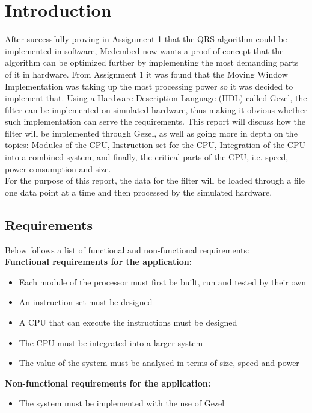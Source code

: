 \documentclass[12pt,a4paper]{article}
\begin{document}
\section{Introduction}
	After successfully proving in Assignment 1 that the QRS algorithm could be implemented in software, Medembed now wants a proof of concept that the algorithm can be optimized further by implementing the most demanding parts of it in hardware. From Assignment 1 it was found that the Moving Window Implementation was taking up the most processing power so it was decided to implement that. Using a Hardware Description Language (HDL) called Gezel, the filter can be implemented on simulated hardware, thus making it obvious whether such implementation can serve the requirements.
	This report will discuss how the filter will be implemented through Gezel, as well as going more in depth on the topics: Modules of the CPU, Instruction set for the CPU, Integration of the CPU into a combined system, and finally, the critical parts of the CPU, i.e. speed, power consumption and size.\\
	For the purpose of this report, the data for the filter will be loaded through a file one data point at a time and then processed by the simulated hardware.\\
	
\subsection{Requirements}
Below follows a list of functional and non-functional requirements:\\

\textbf{ Functional requirements for the application:}
\begin{itemize}
	\item Each module of the processor must first be built, run and tested by their own
	\item An instruction set must be designed
	\item A CPU that can execute the instructions must be designed
	\item The CPU must be integrated into a larger system
	\item The value of the system must be analysed in terms of size, speed and power

\end{itemize}
\textbf{Non-functional requirements for the application:}
\begin {itemize}
	\item The system must be implemented with the use of Gezel
\end{itemize}
\end{document}
